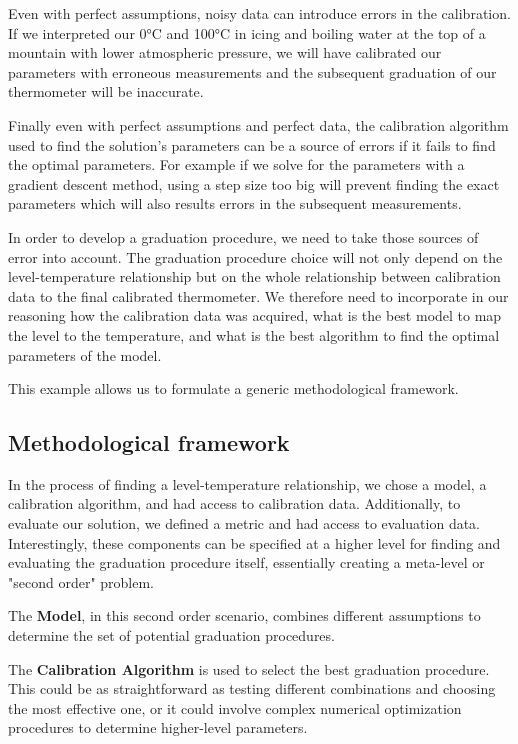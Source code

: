 \begin{bibunit}
 Even with perfect assumptions, noisy data can introduce errors in the calibration. If we interpreted our 0°C and 100°C in icing and boiling water at the top of a mountain with lower atmospheric pressure, we will have calibrated our parameters with erroneous measurements and the subsequent graduation of our thermometer will be inaccurate.

 Finally even with perfect assumptions and perfect data, the calibration algorithm used to find the solution's parameters can be a source of errors if it fails to find the optimal parameters. For example if we solve for the parameters with a gradient descent method, using a step size too big will prevent finding the exact parameters which will also results errors in the subsequent measurements.

In order to develop a graduation procedure, we need to take those sources of error into account. The graduation procedure choice will not only depend on the level-temperature relationship but on the whole relationship between calibration data to the final calibrated thermometer. We therefore need to incorporate in our reasoning how the calibration data was acquired, what is the best model to map the level to the temperature, and what is the best algorithm to find the optimal parameters of the model.


This example allows us to formulate a generic methodological framework.

\subsection{Methodological framework}
In the process of finding a level-temperature relationship, we chose a model, a calibration algorithm, and had access to calibration data. Additionally, to evaluate our solution, we defined a metric and had access to evaluation data. Interestingly, these components can be specified at a higher level for finding and evaluating the graduation procedure itself, essentially creating a meta-level or "second order" problem.

The \textbf{Model}, in this second order scenario, combines different assumptions to determine the set of potential graduation procedures. 

The \textbf{Calibration Algorithm} is used to select the best graduation procedure. This could be as straightforward as testing different combinations and choosing the most effective one, or it could involve complex numerical optimization procedures to determine higher-level parameters.


\end{bibunit}

